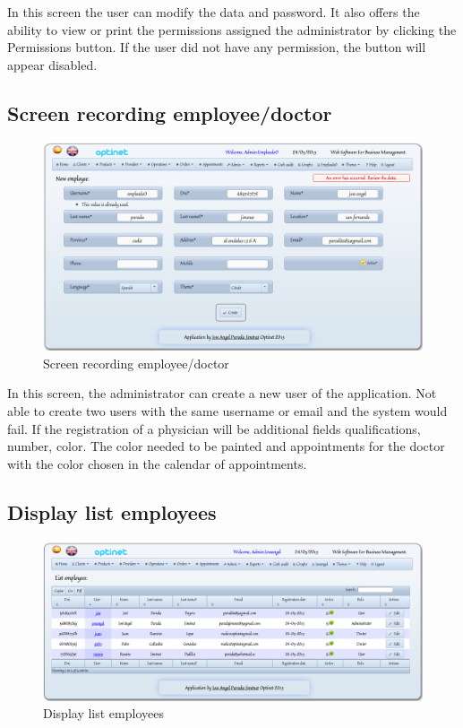 \documentclass[a4paper,11pt]{book}
\begin{document}
In this screen the user can modify the data and password. It also offers the ability to view or print the permissions assigned the administrator by clicking the Permissions button. If the user did not have any permission, the button will appear disabled.

\newpage
\subsection {Screen recording employee/doctor}

\begin{figure}[!htb]
  \centering
    \includegraphics[scale=0.35]{icapregistroemp.png}
  \caption{Screen recording employee/doctor}
  \label{a}
\end{figure}

In this screen, the administrator can create a new user of the application. Not able to create two users with the same username or email and the system would fail. If the registration of a physician will be additional fields qualifications, number, color. The color needed to be painted and appointments for the doctor with the color chosen in the calendar of appointments.

\newpage
\subsection {Display list employees}

\begin{figure}[!htb]
  \centering
    \includegraphics[scale=0.35]{icaplistarempleados.png}
  \caption{Display list employees}
  \label{a}
\end{figure}
\end{document}

